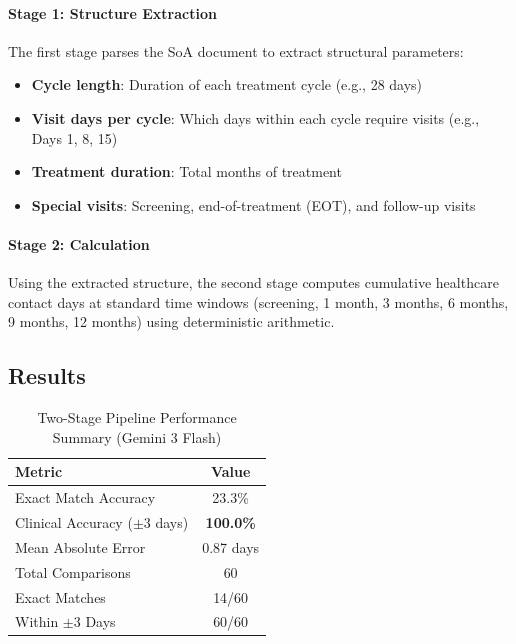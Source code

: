 \paragraph{Stage 1: Structure Extraction}
The first stage parses the SoA document to extract structural parameters:
\begin{itemize}
    \item \textbf{Cycle length}: Duration of each treatment cycle (e.g., 28 days)
    \item \textbf{Visit days per cycle}: Which days within each cycle require visits (e.g., Days 1, 8, 15)
    \item \textbf{Treatment duration}: Total months of treatment
    \item \textbf{Special visits}: Screening, end-of-treatment (EOT), and follow-up visits
\end{itemize}

\paragraph{Stage 2: Calculation}
Using the extracted structure, the second stage computes cumulative healthcare contact days at standard time windows (screening, 1 month, 3 months, 6 months, 9 months, 12 months) using deterministic arithmetic.


\subsection{Results}

\begin{table}[htbp]
\centering
\caption{Two-Stage Pipeline Performance Summary (Gemini 3 Flash)}
\label{tab:two_stage_summary}
\begin{tabular}{lc}
\toprule
\textbf{Metric} & \textbf{Value} \\
\midrule
Exact Match Accuracy & 23.3\% \\
Clinical Accuracy ($\pm$3 days) & \textbf{100.0\%} \\
Mean Absolute Error & 0.87 days \\
Total Comparisons & 60 \\
Exact Matches & 14/60 \\
Within $\pm$3 Days & 60/60 \\
\bottomrule
\end{tabular}
\end{table}

